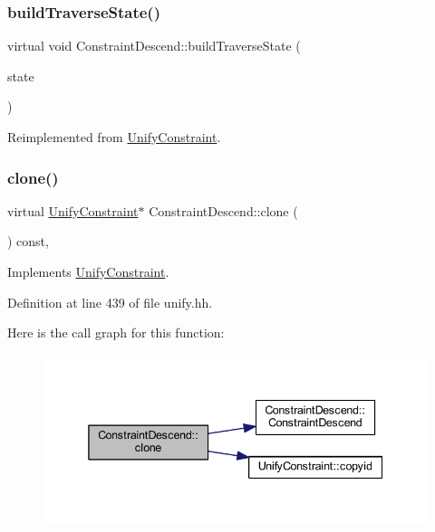 \subsubsection{\texorpdfstring{buildTraverseState()}{buildTraverseState()}}
{\footnotesize\ttfamily virtual void Constraint\+Descend\+::build\+Traverse\+State (\begin{DoxyParamCaption}\item[{\mbox{\hyperlink{class_unify_state}{Unify\+State}} \&}]{state }\end{DoxyParamCaption})\hspace{0.3cm}{\ttfamily [virtual]}}



Reimplemented from \mbox{\hyperlink{class_unify_constraint_a5e1db6cd9dc1c2c22f6a98d5c1556e41}{Unify\+Constraint}}.

\mbox{\label{class_constraint_descend_aca4b2033e9d1324fc4b01e76019698c8}} 
\subsubsection{\texorpdfstring{clone()}{clone()}}
{\footnotesize\ttfamily virtual \mbox{\hyperlink{class_unify_constraint}{Unify\+Constraint}}$\ast$ Constraint\+Descend\+::clone (\begin{DoxyParamCaption}\item[{void}]{ }\end{DoxyParamCaption}) const\hspace{0.3cm}{\ttfamily [inline]}, {\ttfamily [virtual]}}



Implements \mbox{\hyperlink{class_unify_constraint_a4f068343932637d355644bb21559aa12}{Unify\+Constraint}}.



Definition at line 439 of file unify.\+hh.

Here is the call graph for this function\+:
\nopagebreak
\begin{figure}[H]
\begin{center}
\leavevmode
\includegraphics[width=338pt]{class_constraint_descend_aca4b2033e9d1324fc4b01e76019698c8_cgraph}
\end{center}
\end{figure}
\mbox{\label{class_constraint_descend_a6c98fbd098e48ff4dc789522230612ce}} 
